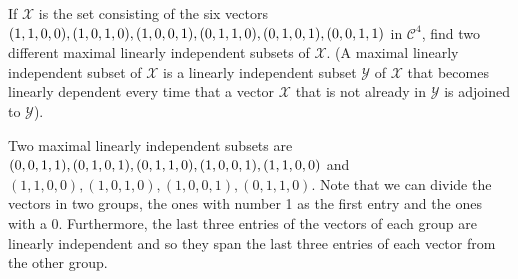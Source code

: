 \documentclass[12pt]{article}
\newenvironment{problem}[2][Problem]{\begin{trivlist} \item[\hskip \labelsep {\bfseries #1}\hskip \labelsep {\bfseries #2.}]}{\end{trivlist}}
\newenvironment{solution}[1][Solution]{\begin{trivlist} \item[\hskip \labelsep {\bfseries #1}]}{\end{trivlist}}
\begin{document}
\begin{problem}{10}
  If $\mathcal{X}$ is the set consisting of the six vectors $(1,1,0,0),(1,0,1,0),(1,0,0,1),(0,1,1,0),\\ (0,1,0,1),(0,0,1,1)$ in $\mathcal{C}^{4}$, find two different maximal linearly independent subsets of $\mathcal{X}$. (A maximal linearly independent subset of $\mathcal{X}$ is a linearly independent subset $\mathcal{Y}$ of $\mathcal{X}$ that becomes linearly dependent every time that a vector $\mathcal{X}$ that is not already in $\mathcal{Y}$ is adjoined to $\mathcal{Y}$). 
\begin{solution}
  Two maximal linearly independent subsets are $(0,0,1,1),(0,1,0,1),\\ (0,1,1,0),(1,0,0,1),(1,1,0,0)$ and $(1,1,0,0),(1,0,1,0),(1,0,0,1),(0,1,1,0)$. Note that we can divide the vectors in two groups, the ones with number 1 as the first entry and the ones with a 0. Furthermore, the last three entries of the vectors of each group are linearly independent and so they span the last three entries of each vector from the other group.   
\end{solution}
\end{problem}
\end{document}
